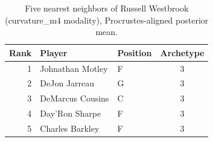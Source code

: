 \begin{table}[htbp]
  \centering\small
  \begin{tabular}{rllc}
    \toprule
    Rank & Player & Position & Archetype \\
    \midrule
    1 & Johnathan Motley & F & 3 \\
    2 & DeJon Jarreau & G & 3 \\
    3 & DeMarcus Cousins & C & 3 \\
    4 & Day'Ron Sharpe & F & 3 \\
    5 & Charles Barkley & F & 3 \\
    \bottomrule
  \end{tabular}
  \caption{Five nearest neighbors of Russell Westbrook (curvature_m4 modality), Procrustes-aligned posterior mean.}
  \label{tab:Russell_Westbrook_neighbors_curvature_m4}
\end{table}

